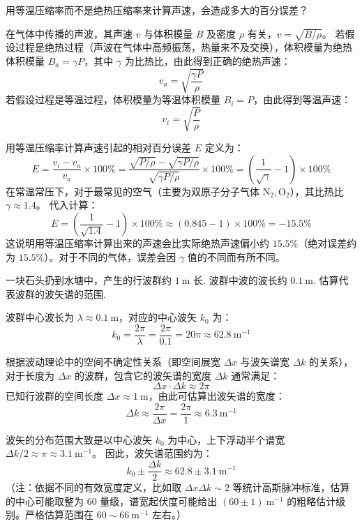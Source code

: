\begin{exercise}\label{ex:8.4}
用等温压缩率而不是绝热压缩率来计算声速，会造成多大的百分误差？
\end{exercise}
\begin{solution}
在气体中传播的声波，其声速 $v$ 与体积模量 $B$ 及密度 $\rho$ 有关，$v = \sqrt{B/\rho}$。
若假设过程是绝热过程（声波在气体中高频振荡，热量来不及交换），体积模量为绝热体积模量 $B_a = \gamma P$，其中 $\gamma$ 为比热比，由此得到正确的绝热声速：
$$ v_a = \sqrt{\frac{\gamma P}{\rho}} $$
若假设过程是等温过程，体积模量为等温体积模量 $B_i = P$，由此得到等温声速：
$$ v_i = \sqrt{\frac{P}{\rho}} $$

用等温压缩率计算声速引起的相对百分误差 $E$ 定义为：
$$ E = \frac{v_i - v_a}{v_a} \times 100\% = \frac{\sqrt{P/\rho} - \sqrt{\gamma P/\rho}}{\sqrt{\gamma P/\rho}} \times 100\% = \left( \frac{1}{\sqrt{\gamma}} - 1 \right) \times 100\% $$
在常温常压下，对于最常见的空气（主要为双原子分子气体 $\mathrm{N_2}, \mathrm{O_2}$），其比热比 $\gamma \approx 1.4$。
代入计算：
$$ E = \left( \frac{1}{\sqrt{1.4}} - 1 \right) \times 100\% \approx (0.845 - 1) \times 100\% = -15.5\% $$
这说明用等温压缩率计算出来的声速会比实际绝热声速偏小约 $15.5\%$（绝对误差约为 $15.5\%$）。对于不同的气体，误差会因 $\gamma$ 值的不同而有所不同。
\end{solution}

\begin{exercise}\label{ex:8.5}
一块石头扔到水塘中，产生的行波群约 $1 \ \mathrm{m}$ 长. 波群中波的波长约 $0.1 \ \mathrm{m}$. 估算代表波群的波矢谱的范围.
\end{exercise}
\begin{solution}
波群中心波长为 $\lambda \approx 0.1 \ \mathrm{m}$，对应的中心波矢 $k_0$ 为：
$$ k_0 = \frac{2\pi}{\lambda} = \frac{2\pi}{0.1} = 20\pi \approx 62.8 \ \mathrm{m^{-1}} $$

根据波动理论中的空间不确定性关系（即空间展宽 $\Delta x$ 与波矢谱宽 $\Delta k$ 的关系），对于长度为 $\Delta x$ 的波群，包含它的波矢谱的宽度 $\Delta k$ 通常满足：
$$ \Delta x \cdot \Delta k \approx 2\pi $$
已知行波群的空间长度 $\Delta x \approx 1 \ \mathrm{m}$，由此可估算出波矢谱的宽度：
$$ \Delta k \approx \frac{2\pi}{\Delta x} = \frac{2\pi}{1} \approx 6.3 \ \mathrm{m^{-1}} $$

波矢的分布范围大致是以中心波矢 $k_0$ 为中心，上下浮动半个谱宽 $\Delta k / 2 \approx \pi \approx 3.1 \ \mathrm{m^{-1}}$。
因此，波矢谱范围约为：
$$ k_0 \pm \frac{\Delta k}{2} \approx 62.8 \pm 3.1 \ \mathrm{m^{-1}} $$
（注：依据不同的有效宽度定义，比如取 $\Delta x \Delta k \sim 2$ 等统计高斯脉冲标准，估算的中心可能取整为 $60$ 量级，谱宽起伏度可能给出 $(60 \pm 1) \ \mathrm{m^{-1}}$ 的粗略估计级别。严格估算范围在 $60 \sim 66 \ \mathrm{m^{-1}}$ 左右。）
\end{solution}

